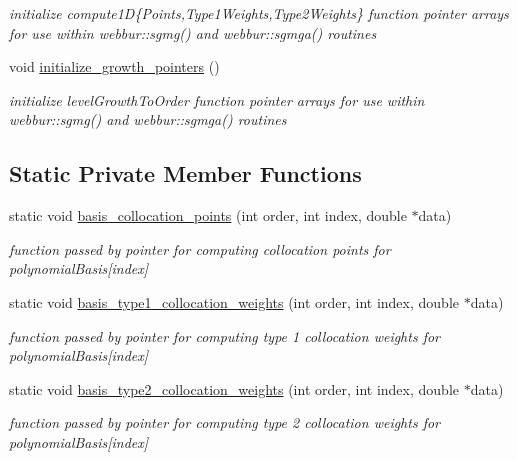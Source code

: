 \begin{DoxyCompactItemize}
\begin{DoxyCompactList}\small\item\em initialize compute1D\{Points,Type1\+Weights,Type2\+Weights\} function pointer arrays for use within webbur\+::sgmg() and webbur\+::sgmga() routines \end{DoxyCompactList}\item 
void \hyperlink{classPecos_1_1CombinedSparseGridDriver_a3f71fb5043e7b955763a076a47ada140}{initialize\+\_\+growth\+\_\+pointers} ()\label{classPecos_1_1CombinedSparseGridDriver_a3f71fb5043e7b955763a076a47ada140}

\begin{DoxyCompactList}\small\item\em initialize level\+Growth\+To\+Order function pointer arrays for use within webbur\+::sgmg() and webbur\+::sgmga() routines \end{DoxyCompactList}\end{DoxyCompactItemize}
\subsection*{Static Private Member Functions}
\begin{DoxyCompactItemize}
\item 
static void \hyperlink{classPecos_1_1CombinedSparseGridDriver_a085247bab449952c1e08f3cb430a9eb4}{basis\+\_\+collocation\+\_\+points} (int order, int index, double $\ast$data)\label{classPecos_1_1CombinedSparseGridDriver_a085247bab449952c1e08f3cb430a9eb4}

\begin{DoxyCompactList}\small\item\em function passed by pointer for computing collocation points for polynomial\+Basis\mbox{[}index\mbox{]} \end{DoxyCompactList}\item 
static void \hyperlink{classPecos_1_1CombinedSparseGridDriver_ae4518865e9bff4753c3548ebc15fc16e}{basis\+\_\+type1\+\_\+collocation\+\_\+weights} (int order, int index, double $\ast$data)\label{classPecos_1_1CombinedSparseGridDriver_ae4518865e9bff4753c3548ebc15fc16e}

\begin{DoxyCompactList}\small\item\em function passed by pointer for computing type 1 collocation weights for polynomial\+Basis\mbox{[}index\mbox{]} \end{DoxyCompactList}\item 
static void \hyperlink{classPecos_1_1CombinedSparseGridDriver_abc415a7cb5d69e669b6979c32a3b1ac4}{basis\+\_\+type2\+\_\+collocation\+\_\+weights} (int order, int index, double $\ast$data)\label{classPecos_1_1CombinedSparseGridDriver_abc415a7cb5d69e669b6979c32a3b1ac4}

\begin{DoxyCompactList}\small\item\em function passed by pointer for computing type 2 collocation weights for polynomial\+Basis\mbox{[}index\mbox{]} \end{DoxyCompactList}\end{DoxyCompactItemize}
